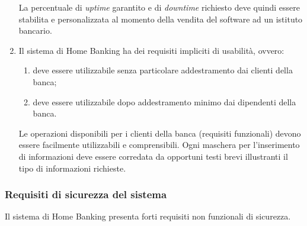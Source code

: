 \begin{enumerate}
	La percentuale di \emph{uptime} garantito e di \emph{downtime} richiesto deve quindi essere stabilita e personalizzata al momento della vendita del software ad un istituto bancario.

	\item Il sistema di Home Banking ha dei requisiti impliciti di usabilit\`a, ovvero:
	\begin{enumerate}
		\item deve essere utilizzabile senza particolare addestramento dai clienti della banca;
		\item deve essere utilizzabile dopo addestramento minimo dai dipendenti della banca.
	\end{enumerate}
	Le operazioni disponibili per i clienti della banca (requisiti funzionali) devono essere facilmente utilizzabili e comprensibili.
	Ogni maschera per l'inserimento di informazioni deve essere corredata da opportuni testi brevi illustranti il tipo di informazioni richieste.
\end{enumerate}

\subsubsection{Requisiti di sicurezza del sistema}

Il sistema di Home Banking presenta forti requisiti non funzionali di sicurezza.

